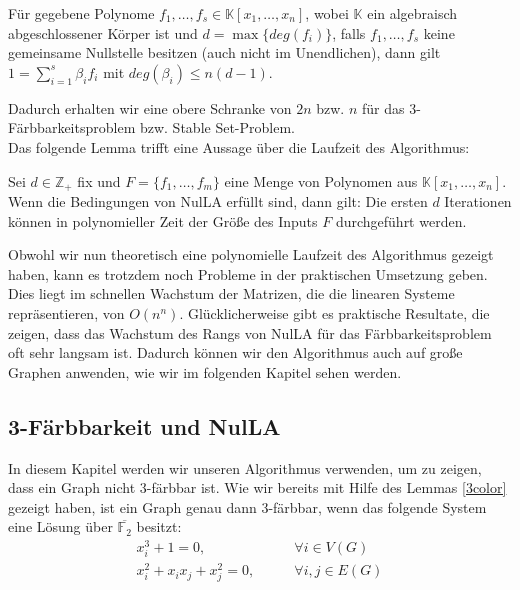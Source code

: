 \begin{corollary}
Für gegebene Polynome $f_1,\ldots,f_s \in \mathbb{K}[x_1,\ldots,x_n]$, wobei $\mathbb{K}$ ein algebraisch abgeschlossener Körper ist und $d = \max\{deg(f_i)\}$, falls $f_1,\ldots,f_s$ keine gemeinsame Nullstelle besitzen (auch nicht im Unendlichen), dann gilt $1 = \sum_{i=1}^s\beta_if_i$ mit $deg(\beta_i) \le n (d-1)$.
\end{corollary}

\noindent Dadurch erhalten wir eine obere Schranke von $2n$ bzw. $n$ für das 3-Färbbarkeitsproblem bzw. Stable Set-Problem. \\

\noindent Das folgende Lemma trifft eine Aussage über die Laufzeit des Algorithmus:
\begin{lemma}\label{polTime}
Sei $d \in \mathbb{Z}_+$ fix und $F = \{f_1,\ldots,f_m\}$ eine Menge von Polynomen aus $\mathbb{K}[x_1,\ldots,x_n]$. Wenn die Bedingungen von NulLA erfüllt sind, dann gilt: Die ersten $d$ Iterationen können in polynomieller Zeit der Größe des Inputs $F$ durchgeführt werden.
\end{lemma}

\noindent Obwohl wir nun theoretisch eine polynomielle Laufzeit des Algorithmus gezeigt haben, kann es trotzdem noch Probleme in der praktischen Umsetzung geben. Dies liegt im schnellen Wachstum der Matrizen, die die linearen Systeme repräsentieren, von $O(n^n)$. Glücklicherweise gibt es praktische Resultate, die zeigen, dass das Wachstum des Rangs von NulLA für das Färbbarkeitsproblem oft sehr langsam ist. Dadurch können wir den Algorithmus auch auf große Graphen anwenden, wie wir im folgenden Kapitel sehen werden. \cite{Ausgangsartikel}



\subsection{3-Färbbarkeit und NulLA} \label{3colorNulLA}

In diesem Kapitel werden wir unseren Algorithmus verwenden, um zu zeigen, dass ein Graph nicht 3-färbbar ist. Wie wir bereits mit Hilfe des Lemmas \ref{3color} gezeigt haben, ist ein Graph genau dann 3-färbbar, wenn das folgende System eine Lösung über $\overline{\mathbb{F}_2}$ besitzt:
\begin{align*}
x_i^3+1=0, \qquad &\forall i \in V(G)\\
x_i^2+x_ix_j+x_j^2=0, \qquad &\forall{i,j}\in E(G) \tag{$\ast$} 
\end{align*}

